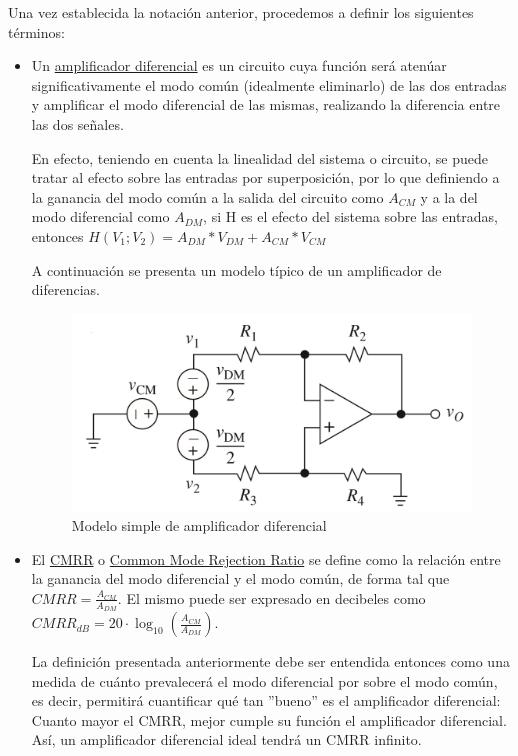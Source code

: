 \documentclass[../../tc_tp3_main.tex]{subfiles}
\begin{document}
	Una vez establecida la notación anterior, procedemos a definir los siguientes términos:\par
	
	\begin{itemize}
	
	\item Un \underline{amplificador diferencial} es un circuito cuya función será atenúar significativamente el modo común (idealmente eliminarlo) de las dos entradas y amplificar el modo diferencial de las mismas, realizando la diferencia entre las dos señales.\par
	En efecto, teniendo en cuenta la linealidad del sistema o circuito, se puede tratar al efecto sobre las entradas por superposición, por lo que definiendo a la ganancia del modo común a la salida del circuito como $A_{CM}$ y a la del modo diferencial como $A_{DM}$, si H es el efecto del sistema sobre las entradas, entonces $H(V_{1};V_{2}) = A_{DM} * V_{DM} + A_{CM} * V_{CM}$\par
	
	A continuación se presenta un modelo típico de un amplificador de diferencias. 
	
	\begin{figure}[H]	%
		\centering
		\includegraphics[scale=0.4]{imagenes/amp_diferencial.png}
		\caption{Modelo simple de amplificador diferencial}
		\label{fig:ej5_amp_diferencial}
	\end{figure}

	\item El \underline{CMRR} o \underline{Common Mode Rejection Ratio} se define como la relación entre la ganancia del modo diferencial y el modo común, de forma tal que $CMRR =  \frac{A_{CM}}{A_{DM}}$. El mismo puede ser expresado en decibeles como $CMRR_{dB} =  20 \cdot \log_{10} {(\frac{A_{CM}}{A_{DM}})}$. \par
	La definición presentada anteriormente debe ser entendida entonces como una medida de cuánto prevalecerá el modo diferencial por sobre el modo común, es decir, permitirá cuantificar qué tan ''bueno'' es el amplificador diferencial: Cuanto mayor el CMRR, mejor cumple su función el  amplificador diferencial. Así, un amplificador diferencial ideal tendrá un CMRR infinito. \par
	

\end{itemize}
\end{document}
